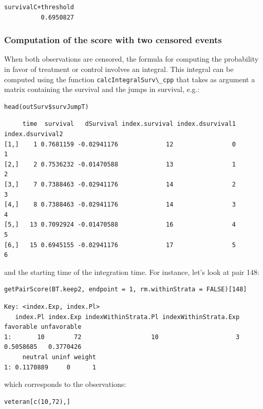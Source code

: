 \documentclass[12pt]{article}
\begin{document}
\begin{verbatim}
survivalC+threshold 
          0.6950827
\end{verbatim}

\subsubsection{Computation of the score with two censored events}
\label{sec:org890096d}

When both observations are censored, the formula for computing the
probability in favor of treatment or control involves an
integral. This integral can be computed using the function
\texttt{calcIntegralSurv\textbackslash{}\_cpp} that takes as argument a matrix containing the
survival and the jumps in survival, e.g.:
\lstset{language=r,label= ,caption= ,captionpos=b,numbers=none}
\begin{lstlisting}
head(outSurv$survJumpT)
\end{lstlisting}

\begin{verbatim}
     time  survival   dSurvival index.survival index.dsurvival1 index.dsurvival2
[1,]    1 0.7681159 -0.02941176             12                0                1
[2,]    2 0.7536232 -0.01470588             13                1                2
[3,]    7 0.7388463 -0.02941176             14                2                3
[4,]    8 0.7388463 -0.02941176             14                3                4
[5,]   13 0.7092924 -0.01470588             16                4                5
[6,]   15 0.6945155 -0.02941176             17                5                6
\end{verbatim}


and the starting time of the integration time. For instance, let's
look at pair 148:
\lstset{language=r,label= ,caption= ,captionpos=b,numbers=none}
\begin{lstlisting}
getPairScore(BT.keep2, endpoint = 1, rm.withinStrata = FALSE)[148]
\end{lstlisting}

\begin{verbatim}
Key: <index.Exp, index.Pl>
   index.Pl index.Exp indexWithinStrata.Pl indexWithinStrata.Exp favorable unfavorable
1:       10        72                   10                     3 0.5058685   0.3770426
     neutral uninf weight
1: 0.1170889     0      1
\end{verbatim}


which corresponds to the observations:
\lstset{language=r,label= ,caption= ,captionpos=b,numbers=none}
\begin{lstlisting}
veteran[c(10,72),]
\end{lstlisting}
\end{document}
